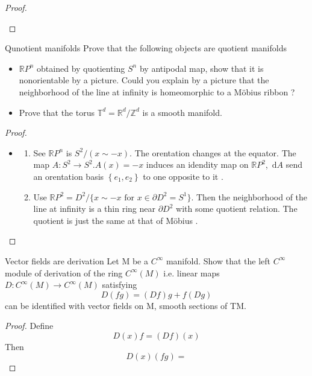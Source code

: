 \documentclass[../main.tex]{subfiles}
\begin{document}
\begin{proof}
\begin{itemize}
 \end{itemize}
  
\end{proof}
\begin{exercise}{Qunotient manifolds}{}
Prove that the following objects are quotient manifolds
\begin{itemize}
    \item $\mathbb{R}P^n$ obtained by quotienting $S^n$ by antipodal map, show that it is nonorientable by a picture. Could you explain by a picture that the neighborhood of the line at infinity is homeomorphic to a Möbius ribbon ?
    \item Prove that the torus $\mathbb{T}^d = \mathbb{R}^d/\mathbb{Z}^d$ is a smooth manifold.
\end{itemize}
\end{exercise}
\begin{proof}

    
    \begin{itemize}


        \item 
        \begin{enumerate}
            \item See \(  \mathbb{R} P^{n}  \) is \(  S^{2}  /\left( x\sim -x \right) \).  The orentation changes at the equator.    The map \(  A: S^{2}\to S^{2} . A\left( x \right)= -x   \) induces an idendity map on \(  \mathbb{R} P^{2}  \), \(  \,\mathrm{d} A  \) send an orentation basis \(  \left\{ e_1,e_2 \right\}  \) to one opposite to it .  
            \item Use $\mathbb{R}P^2 = D^2 / \{x \sim -x \text{ for } x \in \partial D^2 = S^1\}$. Then the neighborhood of the line at infinity is a thin ring near \(   \partial D^{2}  \) with some quotient relation. The quotient is just the same at that of Möbius .
        \end{enumerate}
        
    \end{itemize}
    
\end{proof}
\begin{exercise}{Vector fields are derivation}{}
Let M be a $C^\infty$ manifold. Show that the left $C^\infty$ module of derivation of the ring $C^\infty(M)$ i.e. linear maps $D: C^\infty(M) \to C^\infty(M)$ satisfying
\[ D(fg) = (Df)g + f(Dg) \]
can be identified with vector fields on M, smooth sections of TM.
\end{exercise}
\begin{proof}
    
    Define \[
    D\left( x \right)f=  \left( Df \right)\left( x \right)        
    \] Then \[
    D\left( x \right)\left( fg \right)=   
    \]
\end{proof}
\end{document}

